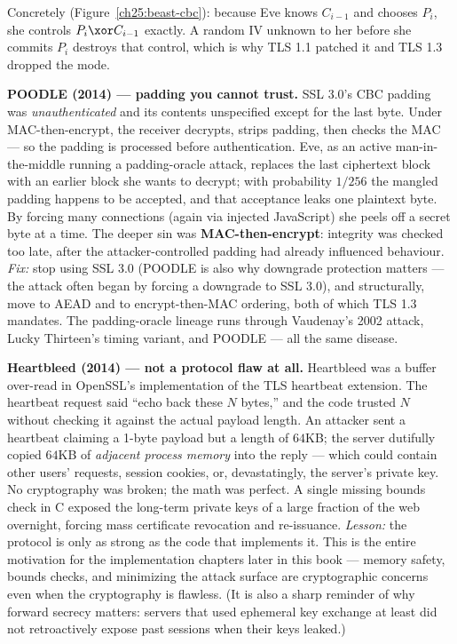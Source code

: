 Concretely (Figure~\ref{ch25:beast-cbc}): because Eve knows $C_{i-1}$ and chooses
$P_i$, she controls $P_i \xor C_{i-1}$ exactly. A random IV unknown to her before
she commits $P_i$ destroys that control, which is why TLS 1.1 patched it and TLS
1.3 dropped the mode.

\begin{attackbox}
\textbf{POODLE (2014) --- padding you cannot trust.} SSL 3.0's CBC padding was
\emph{unauthenticated} and its contents unspecified except for the last byte. Under
MAC-then-encrypt, the receiver decrypts, strips padding, then checks the MAC --- so
the padding is processed before authentication. Eve, as an active man-in-the-middle
running a padding-oracle attack, replaces the last ciphertext block with an earlier
block she wants to decrypt; with probability $1/256$ the mangled padding happens to
be accepted, and that acceptance leaks one plaintext byte. By forcing many
connections (again via injected JavaScript) she peels off a secret byte at a time.
The deeper sin was \textbf{MAC-then-encrypt}: integrity was checked too late, after
the attacker-controlled padding had already influenced behaviour. \emph{Fix:} stop
using SSL 3.0 (POODLE is also why downgrade protection matters --- the attack often
began by forcing a downgrade to SSL 3.0), and structurally, move to AEAD and to
encrypt-then-MAC ordering, both of which TLS 1.3 mandates. The padding-oracle
lineage runs through Vaudenay's 2002 attack, Lucky Thirteen's timing variant, and
POODLE --- all the same disease.
\end{attackbox}

\begin{attackbox}
\textbf{Heartbleed (2014) --- not a protocol flaw at all.} Heartbleed was a buffer
over-read in OpenSSL's implementation of the TLS heartbeat extension. The heartbeat
request said ``echo back these $N$ bytes,'' and the code trusted $N$ without
checking it against the actual payload length. An attacker sent a heartbeat
claiming a 1-byte payload but a length of $64$KB; the server dutifully copied $64$KB
of \emph{adjacent process memory} into the reply --- which could contain other
users' requests, session cookies, or, devastatingly, the server's private key. No
cryptography was broken; the math was perfect. A single missing bounds check in C
exposed the long-term private keys of a large fraction of the web overnight,
forcing mass certificate revocation and re-issuance. \emph{Lesson:} the protocol is
only as strong as the code that implements it. This is the entire motivation for
the implementation chapters later in this book --- memory safety, bounds checks, and
minimizing the attack surface are cryptographic concerns even when the
cryptography is flawless. (It is also a sharp reminder of why forward secrecy
matters: servers that used ephemeral key exchange at least did not retroactively
expose past sessions when their keys leaked.)
\end{attackbox}

